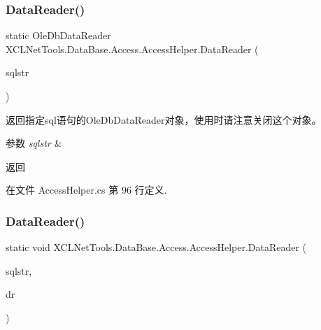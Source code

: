 \subsubsection{\texorpdfstring{Data\+Reader()}{DataReader()}\hspace{0.1cm}{\footnotesize\ttfamily [1/2]}}
{\footnotesize\ttfamily static Ole\+Db\+Data\+Reader X\+C\+L\+Net\+Tools.\+Data\+Base.\+Access.\+Access\+Helper.\+Data\+Reader (\begin{DoxyParamCaption}\item[{string}]{sqlstr }\end{DoxyParamCaption})\hspace{0.3cm}{\ttfamily [static]}}



返回指定sql语句的\+Ole\+Db\+Data\+Reader对象，使用时请注意关闭这个对象。 


\begin{DoxyParams}{参数}
{\em sqlstr} & \\
\hline
\end{DoxyParams}
\begin{DoxyReturn}{返回}

\end{DoxyReturn}


在文件 Access\+Helper.\+cs 第 96 行定义.

\mbox{\label{class_x_c_l_net_tools_1_1_data_base_1_1_access_1_1_access_helper_a1eb9b1ca36a5bd3ea1a3b28d3196f826}} 
\subsubsection{\texorpdfstring{Data\+Reader()}{DataReader()}\hspace{0.1cm}{\footnotesize\ttfamily [2/2]}}
{\footnotesize\ttfamily static void X\+C\+L\+Net\+Tools.\+Data\+Base.\+Access.\+Access\+Helper.\+Data\+Reader (\begin{DoxyParamCaption}\item[{string}]{sqlstr,  }\item[{ref Ole\+Db\+Data\+Reader}]{dr }\end{DoxyParamCaption})\hspace{0.3cm}{\ttfamily [static]}}




